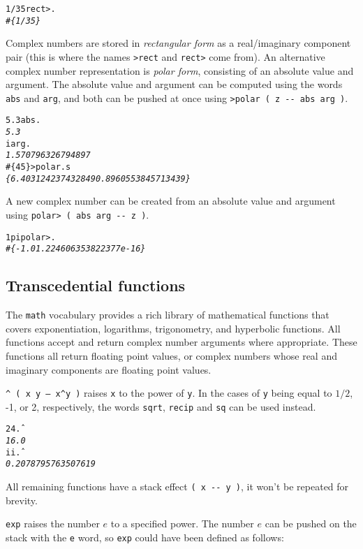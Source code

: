 \documentclass[english]{article}
\begin{document}
\begin{alltt}
1/3 5 rect> .
\emph{\#\{ 1/3 5 \}}
\end{alltt}

Complex numbers are stored in \emph{rectangular form} as a real/imaginary component pair (this is where the names \texttt{>rect} and \texttt{rect>} come from). An alternative complex number representation is \emph{polar form}, consisting of an absolute value and argument. The absolute value and argument can be computed using the words \texttt{abs} and \texttt{arg}, and both can be pushed at once using \texttt{>polar ( z -{}- abs arg )}.

\begin{alltt}
5.3 abs .
\emph{5.3}
i arg .
\emph{1.570796326794897}
\#\{ 4 5 \} >polar .s
\emph{\{ 6.403124237432849 0.8960553845713439 \}}
\end{alltt}

A new complex number can be created from an absolute value and argument using \texttt{polar> ( abs arg -{}- z )}.

\begin{alltt}
1 pi polar> .
\emph{\#\{ -1.0 1.224606353822377e-16 \}}
\end{alltt}

\subsection{Transcedential functions}

The \texttt{math} vocabulary provides a rich library of mathematical functions that covers exponentiation, logarithms, trigonometry, and hyperbolic functions. All functions accept and return complex number arguments where appropriate. These functions all return floating point values, or complex numbers whose real and imaginary components are floating point values.

\texttt{\^{} ( x y -- x\^{}y )} raises \texttt{x} to the power of \texttt{y}. In the cases of \texttt{y} being equal to $1/2$, -1, or 2, respectively, the words \texttt{sqrt}, \texttt{recip} and \texttt{sq} can be used instead.

\begin{alltt}
2 4 \^ .
\emph{16.0}
i i \^ .
\emph{0.2078795763507619}
\end{alltt}

All remaining functions have a stack effect \texttt{( x -{}- y )}, it won't be repeated for brevity.

\texttt{exp} raises the number $e$ to a specified power. The number $e$ can be pushed on the stack with the \texttt{e} word, so \texttt{exp} could have been defined as follows:
\end{document}
